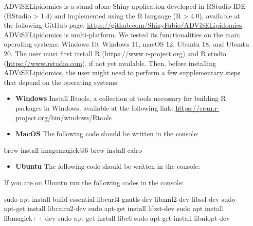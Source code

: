 \documentclass[
]{book}
\newenvironment{Shaded}{\begin{snugshade}}{\end{snugshade}}
\newcommand{\DecValTok}[1]{\textcolor[rgb]{0.00,0.00,0.81}{#1}}
\newcommand{\NormalTok}[1]{#1}
\newcommand{\SpecialCharTok}[1]{\textcolor[rgb]{0.00,0.00,0.00}{#1}}
\providecommand{\tightlist}{%
  \setlength{\itemsep}{0pt}\setlength{\parskip}{0pt}}
\begin{document}
ADViSELipidomics is a stand-alone Shiny application developed in RStudio IDE (RStudio \textgreater{} 1.4) and implemented using the R language (R \textgreater{} 4.0), available at the following GitHub page: \url{https://github.com/ShinyFabio/ADViSELipidomics}. ADViSELipidomics is multi-platform. We tested its functionalities on the main operating systems: Windows 10, Windows 11, macOS 12, Ubuntu 18, and Ubuntu 20.
The user must first install R (\url{https://www.r-project.org}) and R studio (\url{https://www.rstudio.com}), if not yet available. Then, before installing ADViSELipidomics, the user might need to perform a few supplementary steps that depend on the operating systems:

\begin{itemize}
\item
  \textbf{Windows} Install Rtools, a collection of tools necessary for building R packages in Windows, available at the following link: \url{https://cran.r-project.org/bin/windows/Rtools}
\item
  \textbf{MacOS} The following code should be written in the console:
\end{itemize}

\begin{Shaded}
\begin{Highlighting}[]
\NormalTok{brew install imagemagick}\SpecialCharTok{@}\DecValTok{6}
\NormalTok{brew install cairo}
\end{Highlighting}
\end{Shaded}

\begin{itemize}
\tightlist
\item
  \textbf{Ubuntu} The following code should be written in the console:
\end{itemize}

If you are on Ubuntu run the following codes in the console:

\begin{Shaded}
\begin{Highlighting}[]
\NormalTok{sudo apt install build}\SpecialCharTok{{-}}\NormalTok{essential libcurl4}\SpecialCharTok{{-}}\NormalTok{gnutls}\SpecialCharTok{{-}}\NormalTok{dev libxml2}\SpecialCharTok{{-}}\NormalTok{dev libssl}\SpecialCharTok{{-}}\NormalTok{dev}
\NormalTok{sudo apt}\SpecialCharTok{{-}}\NormalTok{get install libcairo2}\SpecialCharTok{{-}}\NormalTok{dev}
\NormalTok{sudo apt}\SpecialCharTok{{-}}\NormalTok{get install libxt}\SpecialCharTok{{-}}\NormalTok{dev}
\NormalTok{sudo apt install libmagick}\SpecialCharTok{++{-}}\NormalTok{dev}
\NormalTok{sudo apt}\SpecialCharTok{{-}}\NormalTok{get install libc6}
\NormalTok{sudo apt}\SpecialCharTok{{-}}\NormalTok{get install libnlopt}\SpecialCharTok{{-}}\NormalTok{dev}
\end{Highlighting}
\end{Shaded}
\end{document}
